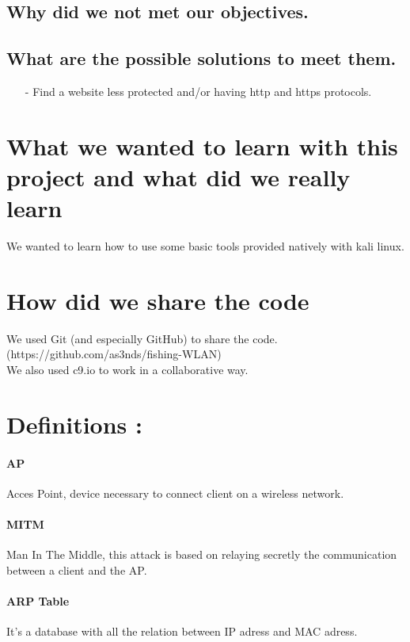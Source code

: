\documentclass[a4paper, 11pt, oneside]{article}
\begin{document}
\subsection{Why did we not met our objectives.}

\subsection{What are the possible solutions to meet them.}
\begin{itemize}
    \item[-] Find a website less protected and/or having http and https protocols.\\
\end{itemize}

\section{What we wanted to learn with this project and what did we really learn}
We wanted to learn how to use some basic tools provided natively with kali linux.\\

\section{How did we share the code}
We used Git (and especially GitHub) to share the code. (https://github.com/as3nds/fishing-WLAN)\\
We also used c9.io to work in a collaborative way.\\

\pagebreak

\section*{Definitions :}
\paragraph{AP}
Acces Point, device necessary to connect client on a wireless network.\\

\paragraph{MITM}
Man In The Middle, this attack is based on relaying secretly the communication between a client and the AP.\\

\paragraph{ARP Table}
It's a database with all the relation between IP adress and MAC adress.\\
\end{document}
